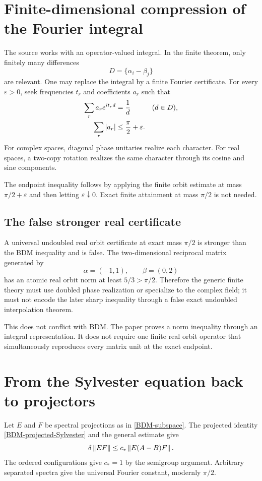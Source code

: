 \section{Finite-dimensional compression of the Fourier integral}

The source works with an operator-valued integral. In the finite theorem, only finitely many differences
\[
  D=\{\alpha_i-\beta_j\}
\]
are relevant. One may replace the integral by a finite Fourier certificate. For every $\varepsilon>0$, seek frequencies $t_r$ and coefficients $a_r$ such that
\begin{align*}
  \sum_r a_r e^{it_r d}&=\frac1d
    &&(d\in D),\\
  \sum_r\left\lvert a_r\right\rvert&\le\frac\pi2+\varepsilon.
\end{align*}
For complex spaces, diagonal phase unitaries realize each character. For real spaces, a two-copy rotation realizes the same character through its cosine and sine components.

The endpoint inequality follows by applying the finite orbit estimate at mass $\pi/2+\varepsilon$ and then letting $\varepsilon\downarrow0$. Exact finite attainment at mass $\pi/2$ is not needed.

\subsection{The false stronger real certificate}

A universal undoubled real orbit certificate at exact mass $\pi/2$ is stronger than the BDM inequality and is false. The two-dimensional reciprocal matrix generated by
\[
  \alpha=(-1,1),
  \qquad
  \beta=(0,2)
\]
has an atomic real orbit norm at least $5/3>\pi/2$. Therefore the generic finite theory must use doubled phase realization or specialize to the complex field; it must not encode the later sharp inequality through a false exact undoubled interpolation theorem.

This does not conflict with BDM. The paper proves a norm inequality through an integral representation. It does not require one finite real orbit operator that simultaneously reproduces every matrix unit at the exact endpoint.

\section{From the Sylvester equation back to projectors}

Let $E$ and $F$ be spectral projections as in \eqref{BDM-subspace}. The projected identity \eqref{BDM-projected-Sylvester} and the general estimate give
\[
  \delta\left\lVert EF\right\rVert
  \le c_*\left\lVert E(A-B)F\right\rVert.
\]
The ordered configurations give $c_*=1$ by the semigroup argument. Arbitrary separated spectra give the universal Fourier constant, modernly $\pi/2$.

